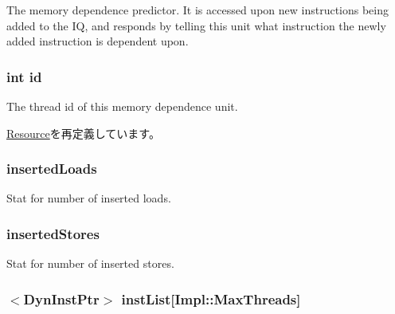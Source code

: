 \label{classMemDepUnit_a2b12193ddce173c34c8c54e0201925bc}
The memory dependence predictor. It is accessed upon new instructions being added to the IQ, and responds by telling this unit what instruction the newly added instruction is dependent upon. \hypertarget{classMemDepUnit_a7441ef0865bcb3db9b8064dd7375c1ea}{
\subsubsection[{id}]{\setlength{\rightskip}{0pt plus 5cm}int {\bf id}}}
\label{classMemDepUnit_a7441ef0865bcb3db9b8064dd7375c1ea}
The thread id of this memory dependence unit. 

\hyperlink{classResource_a7441ef0865bcb3db9b8064dd7375c1ea}{Resource}を再定義しています。\hypertarget{classMemDepUnit_a7810bf3f4630c9898e404e7d46900ad5}{
\subsubsection[{insertedLoads}]{ {\bf insertedLoads}}}
\label{classMemDepUnit_a7810bf3f4630c9898e404e7d46900ad5}
Stat for number of inserted loads. \hypertarget{classMemDepUnit_a5f8daf9e076650e5b9f2f9a6876a3bf7}{
\subsubsection[{insertedStores}]{ {\bf insertedStores}}}
\label{classMemDepUnit_a5f8daf9e076650e5b9f2f9a6876a3bf7}
Stat for number of inserted stores. \hypertarget{classMemDepUnit_a7f2828a4f877a4a4d4b85a6788536b82}{
\subsubsection[{instList}]{$<${\bf DynInstPtr}$>$ {\bf instList}\mbox{[}Impl::MaxThreads\mbox{]}}}

